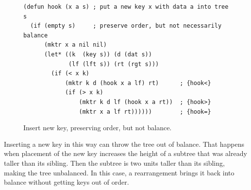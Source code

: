\begin{figure}
\begin{center}
\begin{code}
\begin{verbatim}
(defun hook (x a s) ; put a new key x with data a into tree s
  (if (empty s)     ; preserve order, but not necessarily balance
      (mktr x a nil nil)
      (let* ((k  (key s)) (d (dat s))
             (lf (lft s)) (rt (rgt s)))
        (if (< x k)
            (mktr k d (hook x a lf) rt)      ; {hook<}
            (if (> x k)
                (mktr k d lf (hook x a rt))  ; {hook>}
                (mktr x a lf rt))))))        ; {hook=}
\end{verbatim}
\end{code}
\end{center}
\caption{Insert new key, preserving order, but not balance.}
\label{fig:hook-defun}
\end{figure}

Inserting a new key in this way
can throw the tree out of balance.
That happens when
placement of the new key increases the height of a subtree that was
already taller than its sibling.
Then the subtree is two units taller than its sibling,
making the tree unbalanced.
In this case, a rearrangement brings it back into balance
without getting keys out of order.

